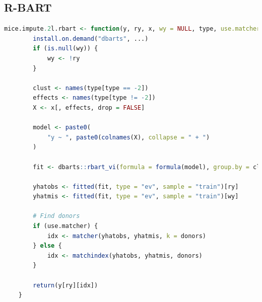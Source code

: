 \documentclass[3p,12pt,a4paper]{elsarticle}
\begin{document}
\subsection{R-BART}
\begin{lstlisting}[language=R, caption={Imputation function for random intercept BART}, label={lst:randominterceptBART}]
    mice.impute.2l.rbart <- function(y, ry, x, wy = NULL, type, use.matcher = FALSE, donors = 5L, ...) {
        install.on.demand("dbarts", ...)
        if (is.null(wy)) {
            wy <- !ry
        }
    
        clust <- names(type[type == -2])
        effects <- names(type[type != -2])
        X <- x[, effects, drop = FALSE]
    
        model <- paste0(
            "y ~ ", paste0(colnames(X), collapse = " + ")
        )
    
        fit <- dbarts::rbart_vi(formula = formula(model), group.by = clust, data = data.frame(y, x), verbose = FALSE, n.threads = 1, n.samples = 500L, n.burn = 500L, ...)
    
        yhatobs <- fitted(fit, type = "ev", sample = "train")[ry]
        yhatmis <- fitted(fit, type = "ev", sample = "train")[wy]
    
        # Find donors
        if (use.matcher) {
            idx <- matcher(yhatobs, yhatmis, k = donors)
        } else {
            idx <- matchindex(yhatobs, yhatmis, donors)
        }
    
        return(y[ry][idx])
    }
\end{lstlisting}
\end{document}
